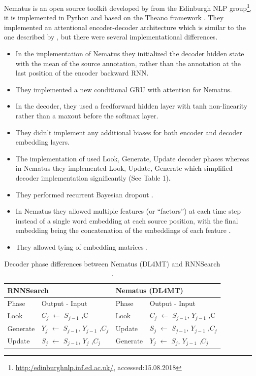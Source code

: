 Nematus is an open source toolkit developed by \cite{DBLP:journals/corr/SennrichFCBHHJL17} from the Edinburgh NLP group\footnote{\url{http:/edinburghnlp.inf.ed.ac.uk/}, accessed:15.08.2018}, it is implemented in Python and based on the Theano framework \citep{DBLP:journals/corr/Al-RfouAAa16} . They implemented an attentional encoder-decoder architecture which is similar to the one described by \cite{DBLP:journals/corr/BahdanauCB14} , but there were several implementational differences.
\begin{itemize}
\item In the implementation of Nematus they initialized the decoder hidden state with the mean of the source annotation, rather than the annotation at the last position of the encoder backward RNN. 
\item They implemented a new conditional GRU with attention for Nematus.
\item In the decoder, they used a feedforward hidden layer with tanh non-linearity rather than a maxout before the softmax layer.
\item They didn’t implement any additional biases for both encoder and decoder embedding layers.
\item The implementation of \cite{DBLP:journals/corr/BahdanauCB14} used Look, Generate, Update decoder phases whereas in Nematus they implemented Look, Update, Generate which simplified decoder implementation significantly (See Table 1). 
\item They performed recurrent Bayesian dropout \citep{Gal:2016:TGA:3157096.3157211}.
\item In Nematus they allowed multiple features (or “factors”) at each time step instead of a single word embedding at each source position, with the final embedding being the concatenation of the embeddings of each feature \citep{DBLP:journals/corr/SennrichH16}.
\item They allowed tying of embedding matrices \citep{DBLP:journals/corr/PressW16,DBLP:journals/corr/InanKS16}.
\end{itemize}

\begin{table}[h!]
\centering
 \begin{tabular}{ |ll|ll|} 
 \hline
 \multicolumn{2}{|l|}{RNNSearch \citep{DBLP:journals/corr/BahdanauCB14}} & \multicolumn{2}{l|}{Nematus (DL4MT)}\\
  \hline  Phase & Output - Input & Phase & Output - Input \\
  \hline Look & $C_j$ $\leftarrow$ $S_{j-1}$ ,C & Look & $C_j$ $\leftarrow$ $S_{j-1}$, $Y_{j-1}$ ,C \\
  Generate & $Y_j$ $\leftarrow$ $S_{j-1}$, $Y_{j-1}$ ,$C_j$ & Update& $S_j$ $\leftarrow$ $S_{j-1}$, $Y_{j-1}$ ,$C_j$ \\
  Update & $S_j$ $\leftarrow$ $S_{j-1}$, $Y_{j}$ ,$C_j$ & Generate& $Y_j$ $\leftarrow$ $S_{j}$, $Y_{j-1}$ ,$C_j$ \\
  \hline
 \end{tabular}

\caption{Decoder phase differences between Nematus (DL4MT)\citep{DBLP:journals/corr/SennrichFCBHHJL17} and RNNSearch \citep{DBLP:journals/corr/BahdanauCB14}. }
\end{table}

